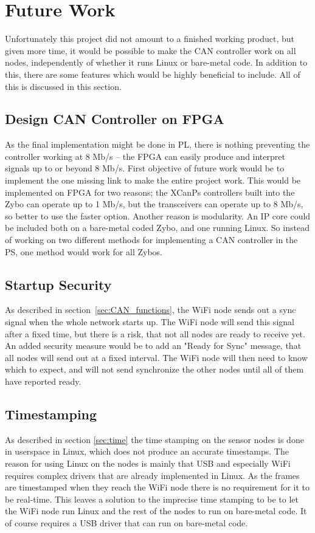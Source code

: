 
\section{Future Work}\label{sec:future_work}
Unfortunately this project did not amount to a finished working product, but given more time, it would be possible to make the CAN controller work on all nodes, independently of whether it runs Linux or bare-metal code.
In addition to this, there are some features which would be  highly beneficial to include.
All of this is discussed in this section.

\subsection*{Design CAN Controller on FPGA}
As the final implementation might be done in PL, there is nothing preventing the controller working at 8 Mb/s -- the FPGA can easily produce and interpret signals up to or beyond 8 Mb/s.
First objective of future work would be to implement the one missing link to make the entire project work.
This would be implemented on FPGA for two reasons;
the XCanPs controllers built into the Zybo can operate up to 1 Mb/s, but the transceivers can operate up to 8 Mb/s, so better to use the faster option.
Another reason is modularity.
An IP core could be included both on a bare-metal coded Zybo, and one running Linux.
So instead of working on two different methods for implementing a CAN controller in the PS, one method would work for all Zybos.

\subsection*{Startup Security}
As described in section~\ref{sec:CAN_functions}, the WiFi node sends out a sync signal when the whole network starts up.
The WiFi node will send this signal after a fixed time, but there is a risk, that not all nodes are ready to receive yet. 
An added security measure would be to add an "Ready for Sync" message, that all nodes will send out at a fixed interval.
The WiFi node will then need to know which to expect, and will not send synchronize the other nodes until all of them have reported ready.

\subsection*{Timestamping}
As described in section \ref{sec:time} the time stamping on the sensor nodes is done in userspace in Linux, which does not produce an  accurate timestamps.
The reason for using Linux on the nodes is mainly that USB and especially WiFi requires complex drivers that are already implemented in Linux.
As the frames are timestamped when they reach the WiFi node there is no requirement for it to be real-time.
This leaves a solution to the imprecise time stamping to be to let the WiFi node run Linux and the rest of the nodes to run on bare-metal code.
It of course requires a USB driver that can run on bare-metal code.

